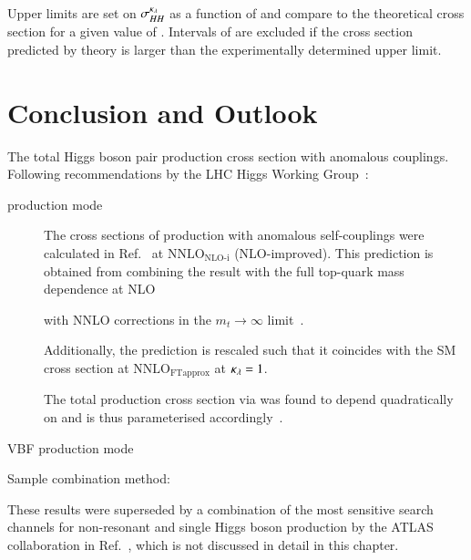 Upper limits are set on $\sigma_{HH}^{\kappa_{\lambda}}$ as a function of
\klambda and compare to the theoretical cross section for a given
value of \klambda. Intervals of \klambda are excluded if the cross
section predicted by theory is larger than the experimentally
determined upper limit.


\section{Conclusion and Outlook}%
\label{sec:reinterpretation_conclusion}


The total Higgs boson pair production cross section with anomalous
couplings. Following recommendations by the LHC Higgs Working
Group~\cite{LHCHWGHH}:
\begin{description}

\item[\ggF production mode] The cross sections of \HH production with
  anomalous self-couplings were calculated in
  Ref.~\cite{Amoroso:2020lgh} at $\text{NNLO}_{\text{NLO-i}}$
  (NLO-improved). This prediction is obtained from combining the
  result with the full top-quark mass dependence at
  NLO~\cite{Buchalla:2018yce}


  with NNLO corrections in the $m_{t} \to \infty$
  limit~\cite{deFlorian:2017qfk}.

  Additionally, the prediction is rescaled such that it coincides with
  the SM \HH cross section at $\text{NNLO}_{\text{FTapprox}}$ at
  $\kappa_{\lambda} = 1$.

  The total \HH production cross section via \ggF was found to depend
  quadratically on \klambda and is thus parameterised
  accordingly~\cite{LHCHWGHH}.

\item[VBF production mode]

\end{description}



Sample combination method:~\cite{ATL-PHYS-PUB-2019-007}



These results were superseded by a combination of the most sensitive
search channels for non-resonant \HH and single Higgs boson production
by the ATLAS collaboration in Ref.~\cite{ATLAS-CONF-2022-050}, which
is not discussed in detail in this chapter.


